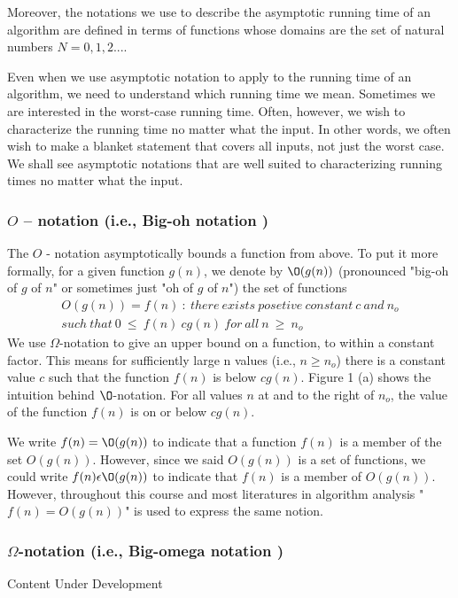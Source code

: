 \documentclass[12pt,a4paper]{book}
\begin{document}
\par Moreover, the notations we use to describe the asymptotic running time of an algorithm are defined in terms of functions whose domains are the set of natural numbers $N = {0, 1, 2...}$.
\par Even when we use asymptotic notation to apply to the running time of an algorithm, we need to understand which running time we mean. Sometimes we are interested in the worst-case running time. Often, however, we wish to characterize the running time no matter what the input. In other words, we often wish to make a blanket statement that covers all inputs, not just the worst case. We shall see asymptotic notations that are well suited to characterizing running times no matter what the input.
\subsubsection{$O$ – notation (i.e., Big-oh notation )}
The $O$ - notation asymptotically bounds a function from above. To put it more formally, for a given function $g(n)$, we denote by $\O(g(n))$ (pronounced "big-oh of $g$ of $n$" or sometimes just "oh of $g$ of $n$") the set of functions
\begin{equation}
\begin{aligned}
O(g(n)) = f(n)\ :\ there\ exists\ posetive\ constant\ \mathit{c}\ and\ n_{o}\\
 such\ that\ 0\ \leq\ f(n)\ cg(n)\ for\ all\ n\ \geq\ n_{o}
\end{aligned}
\end{equation}
We use $\Omega$-notation to give an upper bound on a function, to within a constant factor. This means for sufficiently large n values (i.e., $n \geq n_{o}$) there is a constant value $c$ such that the function $f(n)$ is below $cg(n)$. {\color{red} Figure 1 (a)} shows the intuition behind $\O$-notation. For all values $n$ at and to the right of $n_{o}$, the value of the function $f(n)$ is on or below $cg(n)$.
\par We write $f(n) = \O (g(n))$ to indicate that a function $f(n)$ is a member of the set $O(g(n))$. However, since we said $O(g(n))$ is a set of functions, we could write $f(n) \epsilon \O(g(n))$ to indicate that $f(n)$ is a member of $O(g(n))$. However, throughout this course and most literatures in algorithm analysis "$f(n) = O(g(n))$" is used to express the same notion.
\subsubsection{$\Omega$-notation (i.e., Big-omega notation )}
{\color{red} Content Under Development}
\end{document}
